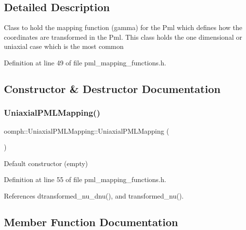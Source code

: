 \subsection{Detailed Description}
Class to hold the mapping function (gamma) for the Pml which defines how the coordinates are transformed in the Pml. This class holds the one dimensional or uniaxial case which is the most common 

Definition at line 49 of file pml\+\_\+mapping\+\_\+functions.\+h.



\subsection{Constructor \& Destructor Documentation}
\mbox{\label{classoomph_1_1UniaxialPMLMapping_a95ac1c46c68f6f74f75901054d36213b}} 
\subsubsection{\texorpdfstring{Uniaxial\+P\+M\+L\+Mapping()}{UniaxialPMLMapping()}}
{\footnotesize\ttfamily oomph\+::\+Uniaxial\+P\+M\+L\+Mapping\+::\+Uniaxial\+P\+M\+L\+Mapping (\begin{DoxyParamCaption}{ }\end{DoxyParamCaption})\hspace{0.3cm}{\ttfamily [inline]}}



Default constructor (empty) 



Definition at line 55 of file pml\+\_\+mapping\+\_\+functions.\+h.



References dtransformed\+\_\+nu\+\_\+dnu(), and transformed\+\_\+nu().



\subsection{Member Function Documentation}
\mbox{\label{classoomph_1_1UniaxialPMLMapping_a2062b54207f13512fd3d9b901c882d44}} 
